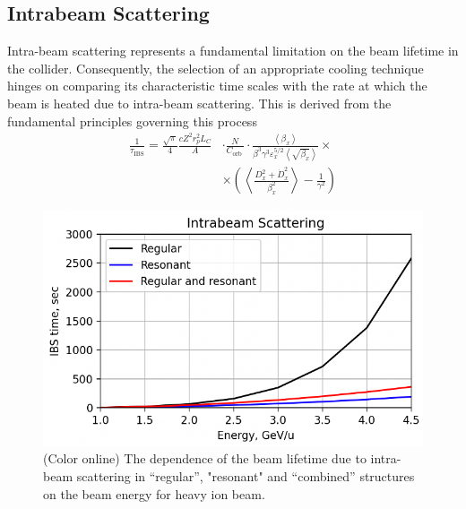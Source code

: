 \documentclass[submitting]{nst}
\begin{document}
\subsection{Intrabeam Scattering}
\par Intra-beam scattering represents a fundamental limitation on the beam lifetime in the collider. Consequently, the selection of an appropriate cooling technique hinges on comparing its characteristic time scales with the rate at which the beam is heated due to intra-beam scattering. This is derived from the fundamental principles governing this process
\begin{equation}
\begin{aligned}
\frac{1}{\tau_{\textrm{IBS}}}=\frac{\sqrt\pi}{4}\frac{cZ^2r_p^2L_C}{A}&\cdot\frac{N}{C_{\mathrm{orb\ }}}\cdot\frac{\left\langle\beta_x\right\rangle}{\beta^3\gamma^3\varepsilon_x^{5/2}\left\langle\sqrt{\beta_x}\right\rangle}\times\\
&\times\left(\left\langle\frac{D_x^2+{\dot{D}}_x^2}{\beta_x^2}\right\rangle-\frac{1}{\gamma^2}\right)
\end{aligned}
\label{eq:ibs}
\end{equation}

\begin{figure}[!htb]
\includegraphics[width=\hsize]{fig6_IBS}
\caption{(Color online) The dependence of the beam lifetime due to intra-beam scattering in “regular”, "resonant" and “combined” structures on the beam energy for heavy ion beam.}
\label{fig:ibs}
\end{figure}
\end{document}
